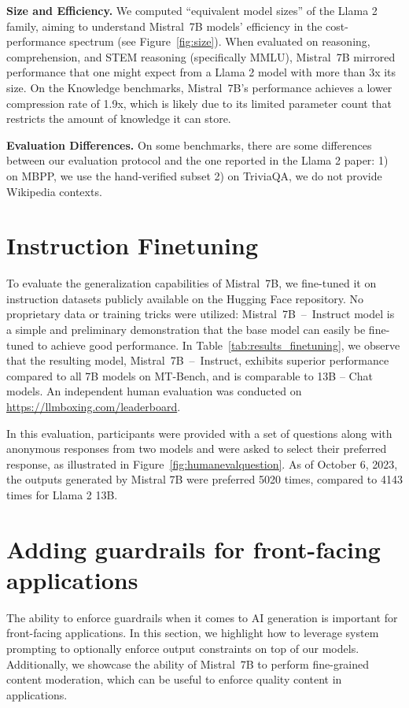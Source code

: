 \textbf{Size and Efficiency.} We computed ``equivalent model sizes'' of the Llama 2 family, aiming to understand Mistral~7B models' efficiency in the cost-performance spectrum (see Figure~\ref{fig:size}). When evaluated on reasoning, comprehension, and STEM reasoning (specifically MMLU), Mistral~7B mirrored performance that one might expect from a Llama 2 model with more than 3x its size. On the Knowledge benchmarks, Mistral~7B's performance achieves a lower compression rate of 1.9x, which is likely due to its limited parameter count that restricts the amount of knowledge it can store.

\textbf{Evaluation Differences.} On some benchmarks, there are some differences between our evaluation protocol and the one reported in the Llama 2 paper: 1) on MBPP, we use the hand-verified subset 2) on TriviaQA, we do not provide Wikipedia contexts.

\section{Instruction Finetuning}

 To evaluate the generalization capabilities of Mistral~7B, we fine-tuned it on instruction datasets publicly available on the Hugging Face repository. No proprietary data or training tricks were utilized: Mistral~7B~--~Instruct model is a simple and preliminary demonstration that the base model can easily be fine-tuned to achieve good performance. In Table~\ref{tab:results_finetuning}, we observe that the resulting model, Mistral~7B~--~Instruct, exhibits superior performance compared to all 7B models on MT-Bench, and is comparable to 13B -- Chat models. An independent human evaluation was conducted on \url{https://llmboxing.com/leaderboard}.

In this evaluation, participants were provided with a set of questions along with anonymous responses from two models and were asked to select their preferred response, as illustrated in Figure~\ref{fig:humanevalquestion}.
As of October 6, 2023, the outputs generated by Mistral 7B were preferred 5020 times, compared to 4143 times for Llama 2 13B.

\section{Adding guardrails for front-facing applications}

 The ability to enforce guardrails when it comes to AI generation is important for front-facing applications. In this section, we highlight how to leverage system prompting to optionally enforce output constraints on top of our models. Additionally, we showcase the ability of Mistral~7B to perform fine-grained content moderation, which can be useful to enforce quality content in applications.


